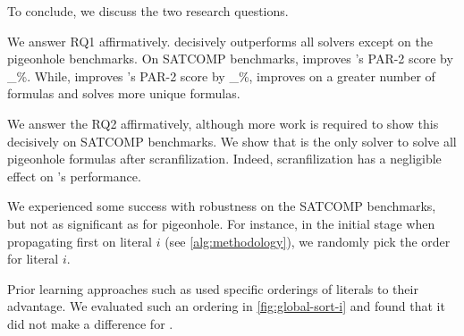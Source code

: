 To conclude, we discuss the two research questions. 

We answer RQ1 affirmatively. \tool decisively outperforms all
solvers except \sadical on the pigeonhole benchmarks. On SATCOMP benchmarks, \tool 
improves \cadical's PAR-2 score by \_\%. While, \prelearn improves \cadical's PAR-2
score by _\%, \tool improves on a greater number of formulas and solves more
unique formulas.

We answer the RQ2 affirmatively, although more work is
required to show this decisively on SATCOMP benchmarks. We show that \tool
is the only solver to solve all pigeonhole formulas after scranfilization. Indeed,
scranfilization has a negligible effect on \tool's performance.

We experienced some success with robustness on the SATCOMP benchmarks, but not
as significant as for pigeonhole. For instance, in the initial stage when
propagating first on literal $i$ (see \autoref{alg:methodology}), we randomly
pick the order for literal $i$.

Prior \pr learning approaches such as \prelearn used specific orderings of
literals to their advantage. We evaluated such an ordering in \autoref{fig:global-sort-i}
and found that it did not make a difference for \tool.

